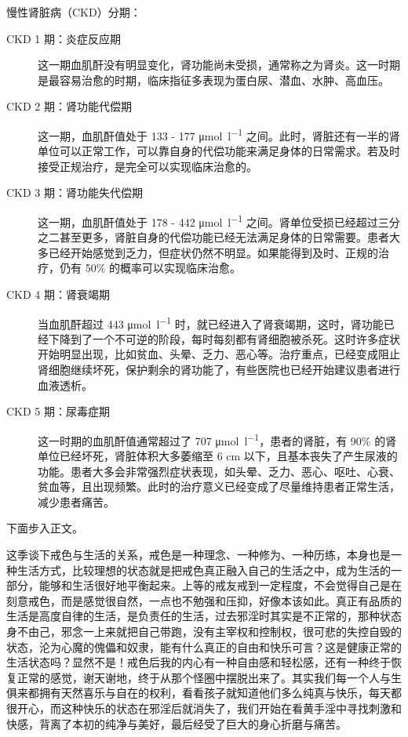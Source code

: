 \begin{case}
    慢性肾脏病（CKD）分期：\begin{description}
        \item[CKD 1 期：炎症反应期] 这一期血肌酐没有明显变化，肾功能尚未受损，通常称之为肾炎。这一时期是最容易治愈的时期，临床指征多表现为蛋白尿、潜血、水肿、高血压。
        \item[CKD 2 期：肾功能代偿期] 这一期，血肌酐值处于 133 - 177 \unit{\micro\mole\per\litre} 之间。此时，肾脏还有一半的肾单位可以正常工作，可以靠自身的代偿功能来满足身体的日常需求。若及时接受正规治疗，是完全可以实现临床治愈的。
        \item[CKD 3 期：肾功能失代偿期] 这一期，血肌酐值处于 178 - 442 \unit{\micro\mole\per\litre} 之间。肾单位受损已经超过三分之二甚至更多，肾脏自身的代偿功能已经无法满足身体的日常需要。患者大多已经开始感觉到乏力，但症状仍然不明显。如果能得到及时、正规的治疗，仍有 50\% 的概率可以实现临床治愈。
        \item[CKD 4 期：肾衰竭期] 当血肌酐超过 443 \unit{\micro\mole\per\litre} 时，就已经进入了肾衰竭期，这时，肾功能已经下降到了一个不可逆的阶段，每时每刻都有肾细胞被杀死。这时许多症状开始明显出现，比如贫血、头晕、乏力、恶心等。治疗重点，已经变成阻止肾细胞继续坏死，保护剩余的肾功能了，有些医院也已经开始建议患者进行血液透析。
        \item[CKD 5 期：尿毒症期] 这一时期的血肌酐值通常超过了 707 \unit{\micro\mole\per\litre}，患者的肾脏，有 90\% 的肾单位已经坏死，肾脏体积大多萎缩至 6 \unit{\centi\metre} 以下，且基本丧失了产生尿液的功能。患者大多会非常强烈症状表现，如头晕、乏力、恶心、呕吐、心衰、贫血等，且出现频繁。此时的治疗意义已经变成了尽量维持患者正常生活，减少患者痛苦。
    \end{description}
\end{case}

下面步入正文。

这季谈下戒色与生活的关系，戒色是一种理念、一种修为、一种历练，本身也是一种生活方式，比较理想的状态就是把戒色真正融入自己的生活之中，成为生活的一部分，能够和生活很好地平衡起来。上等的戒友戒到一定程度，不会觉得自己是在刻意戒色，而是感觉很自然，一点也不勉强和压抑，好像本该如此。真正有品质的生活是高度自律的生活，是负责任的生活，过去邪淫时其实是不正常的，那种状态身不由己，邪念一上来就把自己带跑，没有主宰权和控制权，很可悲的失控自毁的状态，沦为心魔的傀儡和奴隶，能有什么真正的自由和快乐可言？这是健康正常的生活状态吗？显然不是！戒色后我的内心有一种自由感和轻松感，还有一种终于恢复正常的感觉，谢天谢地，终于从那个怪圈中摆脱出来了。其实我们每一个人与生俱来都拥有天然喜乐与自在的权利，看看孩子就知道他们多么纯真与快乐，每天都很开心，而这种快乐的状态在邪淫后就消失了，我们开始在看黄手淫中寻找刺激和快感，背离了本初的纯净与美好，最后经受了巨大的身心折磨与痛苦。

